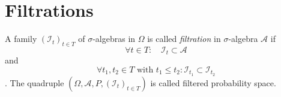 \documentclass[12pt]{article}
\begin{document}
\appendix
\section{Filtrations}
A family $(\mathscr{I}_t)_{t \in T}$ of $\sigma$-algebras in $\Omega$ is called \textit{filtration} in $\sigma$-algebra $\mathscr{A}$ if
\[\forall t \in T: \quad \mathscr{I}_t \subset \mathscr{A}\] and
\[\forall t_1, t_2 \in T \text{ with } t_1 \leq t_2 : \mathscr{I}_{t_1}\subset \mathscr{I}_{t_2}\].
The quadruple $(\Omega , \mathscr{A}, P, (\mathscr{I}_t)_{t \in T})$ is called filtered probability space.
\end{document}
